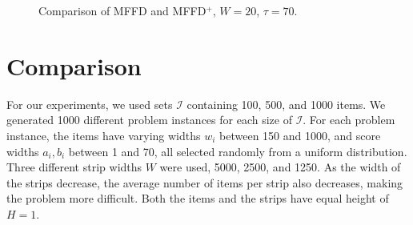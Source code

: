 \documentclass[oribibl]{llncs}
\begin{document}
\begin{figure}[h!]	
	\centering
	
	\caption{Comparison of MFFD and MFFD$^+$, $W = 20$, $\tau = 70$.}	
	\label{fig:comparestrips}
\end{figure}


\section{Comparison}
For our experiments, we used sets $\mathcal{I}$ containing 100, 500, and 1000 items. We generated 1000 different problem instances for each size of $\mathcal{I}$. For each problem instance, the items have varying widths $w_i$ between 150 and 1000, and score widths $a_i, b_i$ between 1 and 70, all selected randomly from a uniform distribution. Three different strip widths $W$ were used, 5000, 2500, and 1250. As the width of the strips decrease, the average number of items per strip also decreases, making the problem more difficult. Both the items and the strips have equal height of $H = 1$.  
\end{document}
